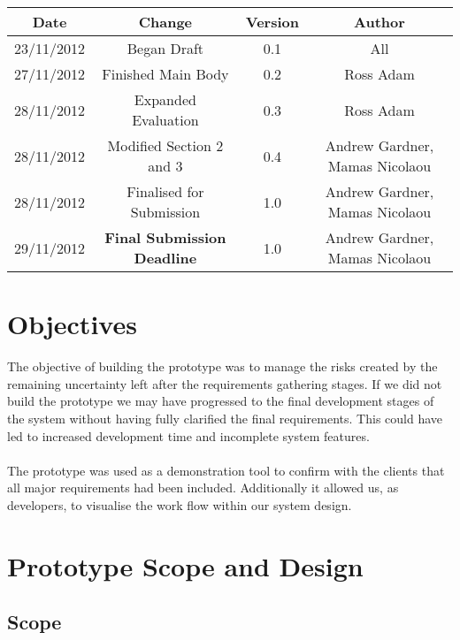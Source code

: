 \documentclass{l3deliverable}
\begin{document}
\begin{center}{
\begin{tabular}{|c|c|c|c|}
\hline \textbf{Date} &\textbf{ Change} & \textbf{Version} &\textbf{Author}\\ 
\hline  23/11/2012 & Began Draft & 0.1 & All\\
\hline 27/11/2012 & Finished Main Body & 0.2 & Ross Adam\\
\hline 28/11/2012 & Expanded Evaluation & 0.3 & Ross
Adam\\
\hline 28/11/2012 & Modified Section 2 and 3 & 0.4 & Andrew Gardner, Mamas Nicolaou\\
\hline 28/11/2012 & Finalised for Submission & 1.0 & Andrew Gardner, Mamas Nicolaou\\
\hline 29/11/2012 & \textbf{Final Submission Deadline} & 1.0 & Andrew Gardner, Mamas Nicolaou \\ 
\hline 
\end{tabular} }
\end{center}


\section{Objectives}

The objective of building the prototype was to manage the risks created by the remaining uncertainty left after the requirements gathering stages. If we did not build the prototype we may have progressed to the final development stages of the system without having fully clarified the final requirements. This could have led to increased development time and incomplete system features.\\
\\
The prototype was used as a demonstration tool to confirm with the clients that all major requirements had been included. Additionally it allowed us, as developers, to visualise the work flow within our system design. 


\section{Prototype Scope and Design}

\subsection{Scope}
\end{document}
